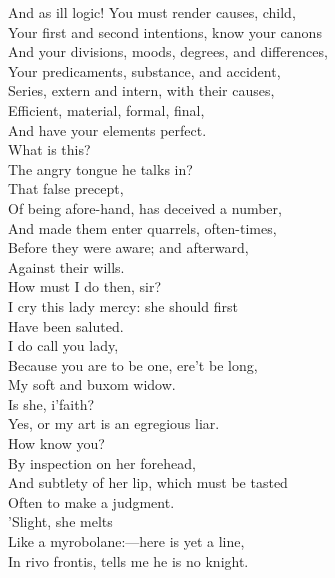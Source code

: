 \documentclass[a4paper,oneside]{memoir}
\begin{document}
\begin{drama*}
And as ill logic! You must render causes, child,\\
Your first and second intentions, know your canons\\
And your divisions, moods, degrees, and differences,\\
Your predicaments, substance, and accident,\\
Series, extern and intern, with their causes,\\
Efficient, material, formal, final,\\
And have your elements perfect.\\
\kastrilspeaks {}  What is this?\\
The angry tongue he talks in?\\
\subtlespeaks {} That false precept,\\
Of being afore-hand, has deceived a number,\\
And made them enter quarrels, often-times,\\
Before they were aware; and afterward,\\
Against their wills.\\
\kastrilspeaks {} How must I do then, sir?\\
\subtlespeaks I cry this lady mercy: she should first\\
Have been saluted.\\
 I do call you lady,\\
Because you are to be one, ere't be long,\\
My soft and buxom widow.\\
\kastrilspeaks {} Is she, i'faith?\\
\subtlespeaks Yes, or my art is an egregious liar.\\
\kastrilspeaks How know you?\\
\subtlespeaks {} By inspection on her forehead,\\
And subtlety of her lip, which must be tasted\\
Often to make a judgment.\\
 'Slight, she melts\\
Like a myrobolane:---here is yet a line,\\
In rivo frontis, tells me he is no knight.\\

\end{drama*}
\end{document}

